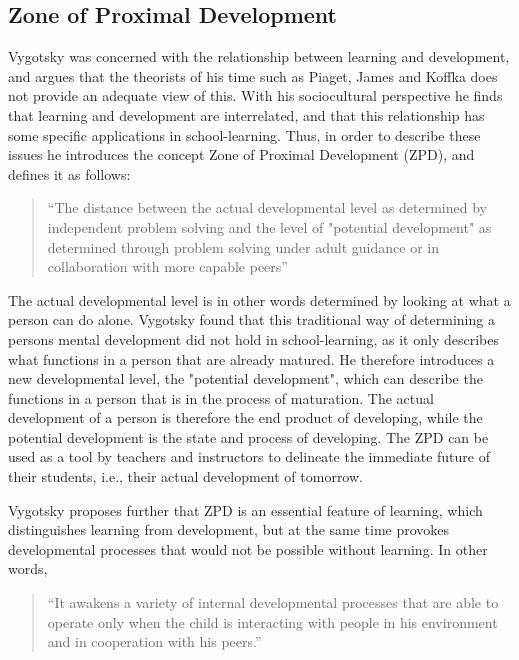 \subsection{Zone of Proximal Development}
Vygotsky was concerned with the relationship between learning and development, and argues that the theorists of his time such as Piaget, James and Koffka does not provide an adequate view of this. With his sociocultural perspective he finds that learning and development are interrelated, and that this relationship has some specific applications in school-learning. \citep[p. 84]{vygotskiui1978mind} Thus, in order to describe these issues he introduces the concept Zone of Proximal Development (ZPD), and defines it as follows:

\begin{quote}“The distance between the actual developmental level as determined by independent problem solving and the level of "potential development" as determined through problem solving under adult guidance or in collaboration with more capable peers” \citep[p. 86]{vygotskiui1978mind}
\end{quote}

The actual developmental level is in other words determined by looking at what a person can do alone. Vygotsky found that this traditional way of determining a persons mental development did not hold in school-learning, as it only describes what functions in a person that are already matured. He therefore introduces a new developmental level, the "potential development", which can describe the functions in a person that is in the process of maturation. The actual development of a person is therefore the end product of developing, while the potential development is the state and process of developing. The ZPD can be used as a tool by teachers and instructors to delineate the immediate future of their students, i.e., their actual development of tomorrow.

Vygotsky proposes further that ZPD is an essential feature of learning, which distinguishes learning from development, but at the same time provokes developmental processes that would not be possible without learning. In other words,

\begin{quote}“It awakens a variety of internal developmental processes that are able to operate only when the child is interacting with people  in  his  environment  and  in  cooperation  with his peers.” \citep[p. 90]{vygotskiui1978mind}
\end{quote}

